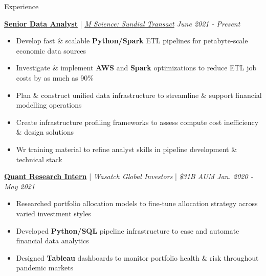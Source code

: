 \documentclass{resume/resume}
\begin{document}
\begin{rSection}{Experience}

  \href{https://mscience.com/}{\bf Senior Data Analyst} | {\em \href{https://sundialdata.com}{M Science: Sundial Transact} \hfill June 2021 - Present}
  \vspace{-6pt}
  \begin{itemize}[nosep]
    \item Develop fast \& scalable {\bf Python/Spark} ETL pipelines for petabyte-scale economic data sources
    \item Investigate \& implement {\bf AWS} and {\bf Spark} optimizations to reduce ETL job costs by as much as 90\%
    \item Plan \& construct unified data infrastructure to streamline \& support financial modelling operations
    \item Create infrastructure profiling frameworks to assess compute cost inefficiency \& design solutions
    \item Wr training material to refine analyst skills in pipeline development \& technical stack
  \end{itemize}

  \href{https://wasatchglobal.com/}{\bf Quant Research Intern} | {\em Wasatch Global Investors} | {\em \$31B AUM \hfill Jan. 2020 - May 2021}
  \vspace{-6pt}
  \begin{itemize}[nosep]
    \item Researched portfolio allocation models to fine-tune allocation strategy across varied investment styles
    \item Developed {\bf Python/SQL} pipeline infrastructure to ease and automate financial data analytics
    \item Designed {\bf Tableau} dashboards to monitor portfolio health \& risk throughout pandemic markets
  \end{itemize}


\end{rSection}
\end{document}
